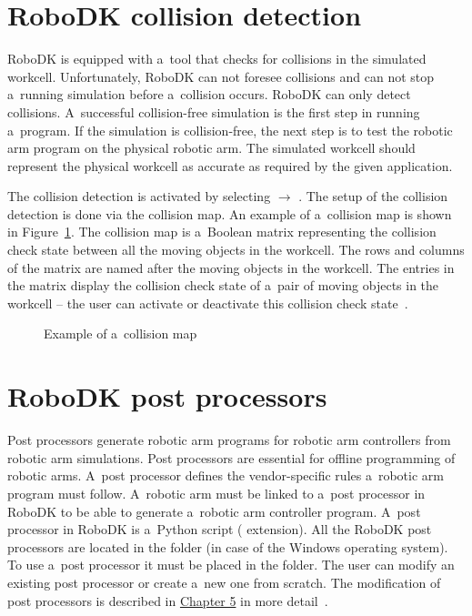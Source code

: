 \section{RoboDK collision detection}

RoboDK is equipped with a~tool that checks for collisions in the simulated workcell. Unfortunately, RoboDK can not foresee collisions and can not stop a~running simulation before a~collision occurs. RoboDK can only detect collisions. A~successful collision-free simulation  is the first step in running a~program. If the simulation is collision-free, the next step is to test the robotic arm program on the physical robotic arm. The simulated workcell should represent the physical workcell as accurate as required by the given application. 

The collision detection is activated by selecting  $\rightarrow$ . The setup of the collision detection is done via the collision map. An example of a~collision map is shown in Figure~\ref{fig:collisionmap}. The collision map is a~Boolean matrix representing the collision check state between all the moving objects in the workcell. The rows and columns of the matrix are named after the moving objects in the workcell. The entries in the matrix display the collision check state of a~pair of moving objects in the workcell -- the user can activate or deactivate this collision check state~\cite{robodkcollision}.

\begin{figure}[h!]
    \centering
    \noindent{}
    \caption{Example of a~collision map}
    \label{fig:collisionmap}
\end{figure}


\section{RoboDK post processors}

Post processors generate robotic arm programs for robotic arm controllers from robotic arm simulations. Post processors are essential for offline programming of robotic arms. A~post processor defines the vendor-specific rules a~robotic arm program must follow. A~robotic arm must be linked to a~post processor in RoboDK to be able to generate a~robotic arm controller program. A~post processor in RoboDK is a~Python script ( extension). All the RoboDK post processors are located in the
 folder (in case of the Windows operating system).  To use a~post processor it must be placed in the  folder. The user can modify an existing post processor or create a~new one from scratch. The modification of post processors is described in \hyperref[chap:implementation]{Chapter 5} in more detail~\cite{robodkposts}. 




